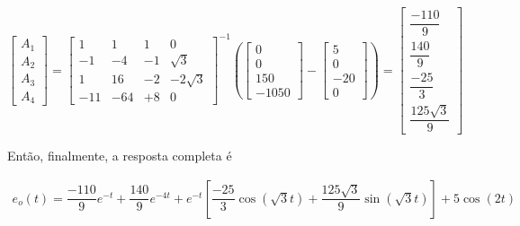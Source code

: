 \documentclass{article}
\numberwithin{equation}{section}
\let\dfr\dfrac
\begin{document}
\begin{equation*}
    \begin{bmatrix}
        A_1\\[6.5mm]
        A_2\\[6.5mm]
        A_3\\[6.5mm]
        A_4
    \end{bmatrix}
    =
    \begin{bmatrix}
        1 & 1 & 1 & 0\\[6.5mm]
        -1 & -4 & -1 & \sqrt{3}\\[6.5mm]
        1 & 16 & -2 & -2\sqrt{3}\\[6.5mm]
        -11 & -64 & +8 & 0
    \end{bmatrix}^{-1}
    \left(
    \begin{bmatrix}
        0\\[6.5mm]
        0\\[6.5mm]
        150\\[6.5mm]
        -1050
    \end{bmatrix}
    -
    \begin{bmatrix}
        5\\[6.5mm]
        0\\[6.5mm]
        -20\\[6.5mm]
        0
    \end{bmatrix}
    \right)
    =
    \begin{bmatrix}
        \dfr{-110}{9}\\[3.5mm]
        \dfr{140}{9}\\[3.5mm]
        \dfr{-25}{3}\\[3.5mm]
        \dfr{125\sqrt{3}}{9}
    \end{bmatrix}
\end{equation*}

\noindent Então, finalmente, a resposta completa é


\begin{equation*}
    \begin{split}
        e_{o}(t) = \dfr{-110}{9}e^{-t} + \dfr{140}{9}e^{-4t} + e^{-t}\left[\dfr{-25}{3}\cos\left(\sqrt{3}t\right)+\dfr{125\sqrt{3}}{9}\sin\left(\sqrt{3}t\right)\right] + 5\cos\left(2t\right)
    \end{split}
\end{equation*}


\end{document}
